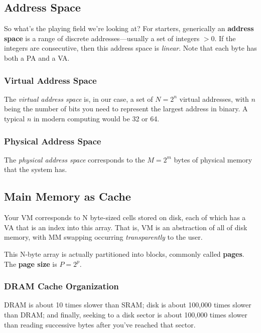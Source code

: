 \documentclass[fleqn]{article}
\begin{document}
\subsection{Address Space}

So what's the playing field we're looking at? For starters, generically an \textbf{address space} is a range of discrete addresses---usually a set of integers $> 0$. If the integers are consecutive, then this address space is \textit{linear}. Note that each byte has both a PA and a VA.

\subsubsection{Virtual Address Space}

The \textit{virtual address space} is, in our case, a set of $N = 2^n$ virtual addresses, with $n$ being the number of bits you need to represent the largest address in binary. A typical $n$ in modern computing would be 32 or 64.

\subsubsection{Physical Address Space}

The \textit{physical address space} corresponds to the $M = 2^m$ bytes of physical memory that the system has.

\subsection{Main Memory as Cache}

Your VM corresponds to N byte-sized cells stored on disk, each of which has a VA that is an index into this array. That is, VM is an abstraction of all of disk memory, with MM swapping occurring \textit{transparently} to the user.

This N-byte array is actually partitioned into blocks, commonly called \textbf{pages}. The \textbf{page size} is $P = 2^p$.

\subsubsection{DRAM Cache Organization}

DRAM is about 10 times slower than SRAM; disk is about 100,000 times slower than DRAM; and finally, seeking to a disk sector is about 100,000 times slower than reading successive bytes after you've reached that sector.
\end{document}
